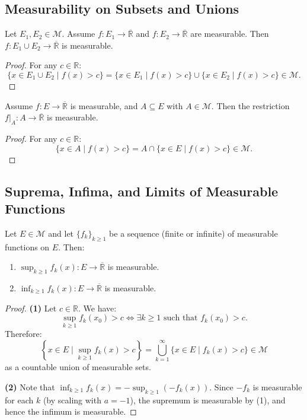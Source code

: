 \documentclass[11pt]{report}
\begin{document}
\subsection{Measurability on Subsets and Unions}

\begin{propbox}
Let $E_1, E_2 \in \mathcal{M}$. Assume $f: E_1 \to \overline{\mathbb{R}}$ and $f: E_2 \to \overline{\mathbb{R}}$ are measurable. Then $f: E_1 \cup E_2 \to \overline{\mathbb{R}}$ is measurable.
\end{propbox}

\begin{proof}
For any $c \in \mathbb{R}$:
\[
\{x \in E_1 \cup E_2 \mid f(x) > c\} = \{x \in E_1 \mid f(x) > c\} \cup \{x \in E_2 \mid f(x) > c\} \in \mathcal{M}.
\]
\end{proof}

\begin{propbox}
Assume $f: E \to \overline{\mathbb{R}}$ is measurable, and $A \subseteq E$ with $A \in \mathcal{M}$. Then the restriction $f|_A: A \to \overline{\mathbb{R}}$ is measurable.
\end{propbox}

\begin{proof}
For any $c \in \mathbb{R}$:
\[
\{x \in A \mid f(x) > c\} = A \cap \{x \in E \mid f(x) > c\} \in \mathcal{M}.
\]
\end{proof}

\subsection{Suprema, Infima, and Limits of Measurable Functions}

\begin{thmbox}
Let $E \in \mathcal{M}$ and let $\{f_k\}_{k \geq 1}$ be a sequence (finite or infinite) of measurable functions on $E$. Then:
\begin{enumerate}
    \item $\displaystyle\sup_{k \geq 1} f_k(x): E \to \overline{\mathbb{R}}$ is measurable.
    \item $\displaystyle\inf_{k \geq 1} f_k(x): E \to \overline{\mathbb{R}}$ is measurable.
\end{enumerate}
\end{thmbox}

\begin{proof}
\textbf{(1)} Let $c \in \mathbb{R}$. We have:
\[
\sup_{k \geq 1} f_k(x_0) > c \iff \exists k \geq 1 \text{ such that } f_k(x_0) > c.
\]
Therefore:
\[
\left\{x \in E \mid \sup_{k \geq 1} f_k(x) > c\right\} = \bigcup_{k=1}^{\infty} \{x \in E \mid f_k(x) > c\} \in \mathcal{M}
\]
as a countable union of measurable sets.

\textbf{(2)} Note that $\inf_{k \geq 1} f_k(x) = -\sup_{k \geq 1}(-f_k(x))$. Since $-f_k$ is measurable for each $k$ (by scaling with $a = -1$), the supremum is measurable by (1), and hence the infimum is measurable.
\end{proof}
\end{document}
